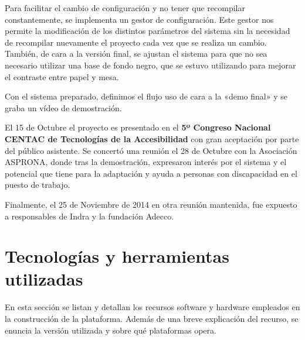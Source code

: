 Para facilitar el cambio de configuración y no tener que recompilar constantemente, se implementa un gestor de configuración. Este gestor nos permite la modificación de los distintos parámetros del sistema sin la necesidad de recompilar nuevamente el proyecto cada vez que se realiza un cambio. También, de cara a la versión final, se ajustan el sistema para que no sea necesario utilizar una base de fondo negro, que se estuvo utilizando para mejorar el contraste entre papel y mesa.

Con el sistema preparado, definimos el flujo uso de cara a la «demo final» y se graba un vídeo de demostración. 

El 15 de Octubre el proyecto es presentado en el \textbf{5º Congreso Nacional CENTAC de Tecnologías de la Accesibilidad} con gran aceptación por parte del público asistente. Se concertó una reunión el 28 de Octubre con la Asociación ASPRONA, donde tras la demostración, expresaron interés por el sistema y el potencial que tiene para la adaptación y ayuda a personas con discapacidad en el puesto de trabajo.

Finalmente, el 25 de Noviembre de 2014 en otra reunión mantenida, fue expuesto a responsables de Indra y la fundación Adecco.   

\section{Tecnologías y herramientas utilizadas}

En esta sección se listan y detallan los recursos software y hardware empleados en la construcción de la plataforma. Además de una breve explicación del recurso, se enuncia la versión utilizada y sobre qué plataformas opera.

